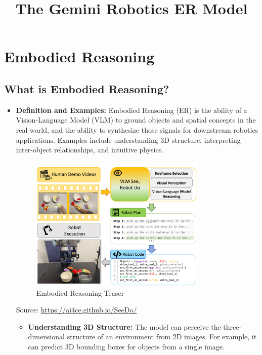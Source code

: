 \documentclass[12pt,a4paper]{article}
\title{The Gemini Robotics ER Model}
\author{}
\date{}
\begin{document}
\maketitle

\section{Embodied Reasoning}

\subsection{What is Embodied Reasoning?}

\begin{itemize}
    \item \textbf{Definition and Examples:} Embodied Reasoning (ER) is the ability of a Vision-Language Model (VLM) to ground objects and spatial concepts in the real world, and the ability to synthesize those signals for downstream robotics applications. Examples include understanding 3D structure, interpreting inter-object relationships, and intuitive physics.

    \begin{figure}[h]
        \centering
        \includegraphics[width=0.8\textwidth]{../reading/keypoints/figures/embodied-reasoning-teaser.jpg}
        \caption{Embodied Reasoning Teaser}
        \label{fig:embodied-reasoning-teaser}
    \end{figure}
    Source: \url{https://ai4ce.github.io/SeeDo/}

    \begin{itemize}
        \item \textbf{Understanding 3D Structure:} The model can perceive the three-dimensional structure of an environment from 2D images. For example, it can predict 3D bounding boxes for objects from a single image.


\end{itemize}
\end{itemize}
\end{document}
